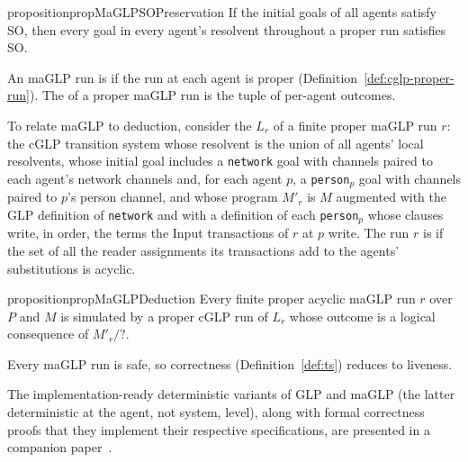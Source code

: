 \begin{restatable}{proposition}{propMaGLPSOPreservation}
\label{prop:maglp-so-preservation}
If the initial goals of all agents satisfy SO, then every goal in every agent's resolvent throughout a proper run satisfies SO.
\end{restatable}

\begin{definition}
\label{def:maglp-proper-run}
An maGLP run is  if the run at each agent is proper (Definition~\ref{def:cglp-proper-run}). The  of a proper maGLP run is the tuple of per-agent outcomes.
\end{definition}

To relate maGLP to deduction, consider the  $L_r$ of a finite proper maGLP run $r$: the cGLP transition system whose resolvent is the union of all agents' local resolvents, whose initial goal includes a \texttt{network} goal with channels paired to each agent's network channels and, for each agent $p$, a \texttt{person}$_p$ goal with channels paired to $p$'s person channel, and whose program $M'_r$ is $M$ augmented with the GLP definition of \texttt{network} and with a definition of each \texttt{person}$_p$ whose clauses write, in order, the terms the Input transactions of $r$ at $p$ write. The run $r$ is  if the set of all the reader assignments its transactions add to the agents' substitutions is acyclic.

\begin{restatable}{proposition}{propMaGLPDeduction}
\label{prop:maglp-deduction}
Every finite proper acyclic maGLP run $r$ over $P$ and $M$ is simulated by a proper cGLP run of $L_r$ whose outcome is a logical consequence of $M'_r/?$.
\end{restatable}

Every maGLP run is safe, so correctness (Definition~\ref{def:ts}) reduces to liveness.

The implementation-ready deterministic variants of GLP and maGLP (the latter deterministic at the agent, not system, level), along with formal correctness proofs that they implement their respective specifications, are presented in a companion paper~\cite{shapiro2026implementing}.
